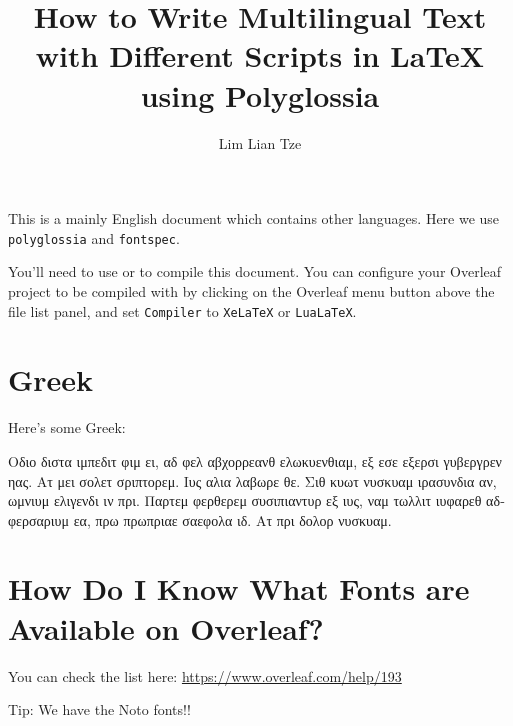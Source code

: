 \documentclass[12pt]{scrartcl}
\title{How to Write Multilingual Text with Different Scripts in \LaTeX{} using Polyglossia}
\author{Lim Lian Tze}
\date{}
\begin{document}
\maketitle

This is a mainly English document which contains other languages. Here we use \texttt{polyglossia} and \texttt{fontspec}.

You'll need to use  or  to compile this document. You can configure your Overleaf project to be compiled with  by clicking on the Overleaf menu button above the file list panel, and set \texttt{Compiler} to \texttt{XeLaTeX} or \texttt{LuaLaTeX}.

\section{Greek}
Here's some Greek:

\begin{greek}
Οδιο διστα ιμπεδιτ φιμ ει, αδ φελ αβχορρεανθ ελωκυενθιαμ, εξ εσε εξερσι γυβεργρεν ηας. Ατ μει σολετ σριπτορεμ. Ιυς αλια λαβωρε θε. Σιθ κυωτ νυσκυαμ ιρασυνδια αν, ωμνιυμ ελιγενδι ιν πρι. Παρτεμ φερθερεμ συσιπιαντυρ εξ ιυς, ναμ τωλλιτ ιυφαρεθ αδφερσαριυμ εα, πρω πρωπριαε σαεφολα ιδ. Ατ πρι δολορ νυσκυαμ.
\end{greek}

\section{How Do I Know What Fonts are Available on Overleaf?}

You can check the list here: \url{https://www.overleaf.com/help/193}

Tip: We have the Noto fonts!!
\end{document}
